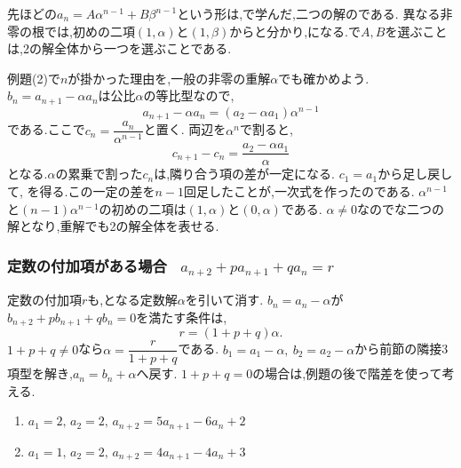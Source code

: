 \label{解釈：三項間と解全体}
    先ほどの$a_n=A\alpha^{n-1}+B\beta^{n-1}$という形は,で学んだ,二つの解のである.
    異なる非零の根では,初めの二項$(1,\alpha)$と$(1,\beta)$からと分かり,になる.で$A,B$を選ぶことは,2の解全体から一つを選ぶことである.

    例題(2)で$n$が掛かった理由を,一般の非零の重解$\alpha$でも確かめよう.
    $b_n=a_{n+1}-\alpha a_n$は公比$\alpha$の等比型なので,
    \[
      a_{n+1}-\alpha a_n=(a_2-\alpha a_1)\alpha^{n-1}
    \]
    である.ここで$c_n=\dfrac{a_n}{\alpha^{n-1}}$と置く.
    両辺を$\alpha^n$で割ると,
    \[
      c_{n+1}-c_n=\frac{a_2-\alpha a_1}{\alpha}
    \]
    となる.$\alpha$の累乗で割った$c_n$は,隣り合う項の差が一定になる.
    $c_1=a_1$から足し戻して,
    \BookMathLayout{\[
      a_n=\left\{a_1+(n-1)\left(\frac{a_2}{\alpha}-a_1\right)\right\}\alpha^{n-1}
    \]}{\[
      \begin{aligned}
        a_n&=\left\{a_1+(n-1)\left(\frac{a_2}{\alpha}-a_1\right)\right\}\\
           &\qquad\cdot\alpha^{n-1}
      \end{aligned}
    \]}
    を得る.この一定の差を$n-1$回足したことが,一次式を作ったのである.
    $\alpha^{n-1}$と$(n-1)\alpha^{n-1}$の初めの二項は$(1,\alpha)$と$(0,\alpha)$である.
    $\alpha\ne0$なのでな二つの解となり,重解でも2の解全体を表せる.

  \subsubsection{\texorpdfstring{定数の付加項がある場合 \, $\displaystyle a_{n+2}+pa_{n+1}+qa_n=r$}{定数の付加項がある場合}}\label{節：等差二次特性方程式型}
    定数の付加項$r$も,となる定数解$\alpha$を引いて消す.
    $b_n=a_n-\alpha$が$b_{n+2}+pb_{n+1}+qb_n=0$を満たす条件は,
    \[
      r=(1+p+q)\alpha.
    \]
    $1+p+q\ne0$なら$\alpha=\dfrac{r}{1+p+q}$である.
    $b_1=a_1-\alpha,\ b_2=a_2-\alpha$から前節の隣接3項型を解き,$a_n=b_n+\alpha$へ戻す.
    $1+p+q=0$の場合は,例題の後で階差を使って考える.

    \noindent {}\par\nobreak
    \begin{enumerate}[label=(\arabic*),parsep=3pt,format=\bookitemlink{example-three-term-2}{problem}{answer}]
      \item $\displaystyle a_1=2,\,a_2=2,\, a_{n+2}=5a_{n+1}-6a_n+2$
      \item $\displaystyle a_1=1,\,a_2=2,\, a_{n+2}=4a_{n+1}-4a_n+3$
    \end{enumerate}

